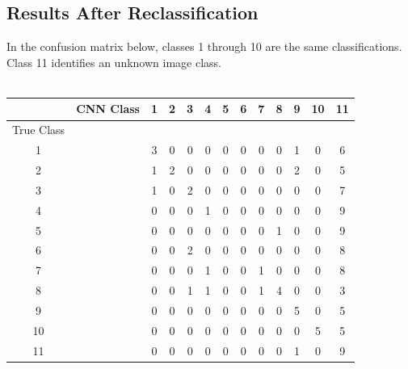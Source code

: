 \documentclass[11pt,english]{article}
\begin{document}
\subsection{Results After Reclassification}
In the confusion matrix below, classes 1 through 10 are the same classifications.  Class 11 identifies an unknown image class. \\\\
\begin{tabular}{ | c | c | c | c | c | c | c | c | c | c | c | c | c | }
\hline
	 & CNN
Class & 1 & 2 & 3 & 4 & 5 & 6 & 7 & 8 & 9 & 10 & 11 \\ \hline
	True 
Class &  &  &  &  &  &  &  &  &  &  &  &  \\ \hline
	1 &  & 3 & 0 & 0 & 0 & 0 & 0 & 0 & 0 & 1 & 0 & 6 \\ \hline
	2 &  & 1 & 2 & 0 & 0 & 0 & 0 & 0 & 0 & 2 & 0 & 5 \\ \hline
	3 &  & 1 & 0 & 2 & 0 & 0 & 0 & 0 & 0 & 0 & 0 & 7 \\ \hline
	4 &  & 0 & 0 & 0 & 1 & 0 & 0 & 0 & 0 & 0 & 0 & 9 \\ \hline
	5 &  & 0 & 0 & 0 & 0 & 0 & 0 & 0 & 1 & 0 & 0 & 9 \\ \hline
	6 &  & 0 & 0 & 2 & 0 & 0 & 0 & 0 & 0 & 0 & 0 & 8 \\ \hline
	7 &  & 0 & 0 & 0 & 1 & 0 & 0 & 1 & 0 & 0 & 0 & 8 \\ \hline
	8 &  & 0 & 0 & 1 & 1 & 0 & 0 & 1 & 4 & 0 & 0 & 3 \\ \hline
	9 &  & 0 & 0 & 0 & 0 & 0 & 0 & 0 & 0 & 5 & 0 & 5 \\ \hline
	10 &  & 0 & 0 & 0 & 0 & 0 & 0 & 0 & 0 & 0 & 5 & 5 \\ \hline
	11 &  & 0 & 0 & 0 & 0 & 0 & 0 & 0 & 0 & 1 & 0 & 9 \\ \hline
\end{tabular}
\end{document}
